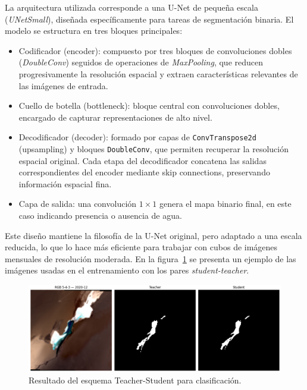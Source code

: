 La arquitectura utilizada corresponde a una U-Net de pequeña escala (\textit{UNetSmall}), diseñada específicamente para tareas de segmentación binaria. El modelo se estructura en tres bloques principales:

\begin{itemize}
    \item Codificador (encoder): compuesto por tres bloques de convoluciones dobles (\textit{DoubleConv}) seguidos de operaciones de \textit{MaxPooling}, que reducen progresivamente la resolución espacial y extraen características relevantes de las imágenes de entrada.

    \item Cuello de botella (bottleneck): bloque central con convoluciones dobles, encargado de capturar representaciones de alto nivel.

    \item Decodificador (decoder): formado por capas de \texttt{ConvTranspose2d} (upsampling) y bloques \texttt{DoubleConv}, que permiten recuperar la resolución espacial original. Cada etapa del decodificador concatena las salidas correspondientes del encoder mediante skip connections, preservando información espacial fina.

    \item Capa de salida: una convolución $1 \times 1$ genera el mapa binario final, en este caso indicando presencia o ausencia de agua.
\end{itemize}

Este diseño mantiene la filosofía de la U-Net original, pero adaptado a una escala reducida, lo que lo hace más eficiente para trabajar con cubos de imágenes mensuales de resolución moderada. En la figura~\ref{fig:class_2} se presenta un ejemplo de las imágenes usadas en el entrenamiento con los pares \textit{student-teacher}.


\begin{figure}[ht]
        \centering
        \includegraphics[scale=.25]
        {Figures/student_teacher.png}
        \caption{Resultado del esquema Teacher-Student para clasificación.}
        \label{fig:class_2}
\end{figure}



